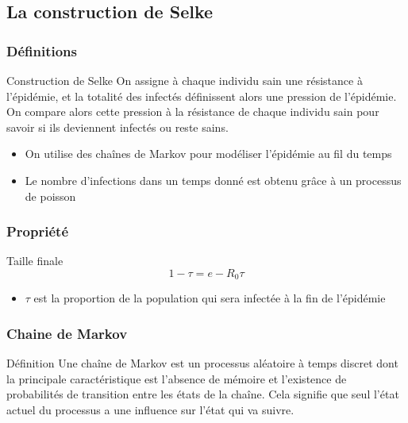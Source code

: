 \subsection{La construction de Selke}

\begin{frame}
    \frametitle{Définitions}

    \begin{block}{Construction de Selke}
        On assigne à chaque individu sain une résistance à l'épidémie, et la totalité des infectés définissent alors une pression de l'épidémie. On compare alors cette pression à la résistance de chaque individu sain pour savoir si ils deviennent infectés ou reste sains.
    \end{block}

    \begin{itemize}
        \item On utilise des chaînes de Markov pour modéliser l'épidémie au fil du temps
        \item Le nombre d'infections dans un temps donné est obtenu grâce à un processus de poisson
    \end{itemize}
\end{frame}

\begin{frame}
    \frametitle{Propriété}

    \begin{block}{Taille finale}
        $$ 1 - \tau = e - R_0\tau $$
    \end{block}

    \begin{itemize}
        \item $\tau$ est la proportion de la population qui sera infectée à la fin de l’épidémie
    \end{itemize}
\end{frame}


\begin{frame}
    \frametitle{Chaine de Markov}

    \begin{block}{Définition}
        Une chaîne de Markov est un processus aléatoire à temps discret dont la principale caractéristique est l’absence de mémoire et l’existence de probabilités de transition entre les états de la chaîne. Cela signifie que seul l’état actuel du processus a une influence sur l’état qui va suivre.
    \end{block}


\end{frame}

